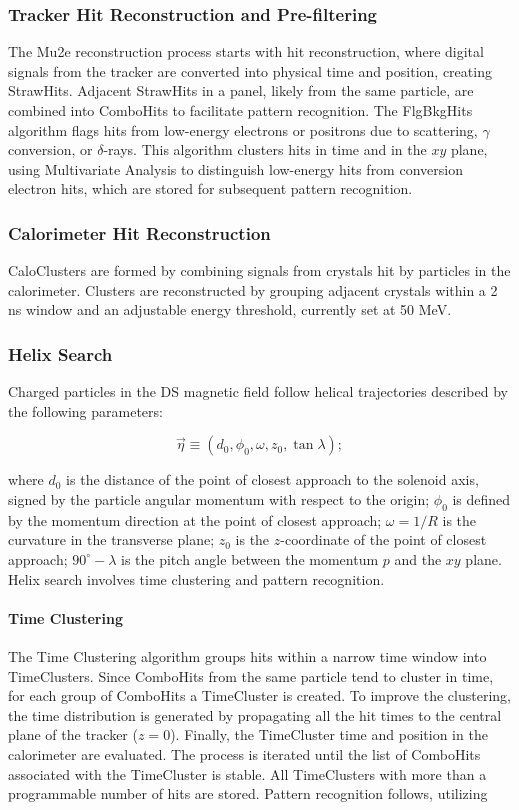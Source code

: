 \subsubsection{Tracker Hit Reconstruction and Pre-filtering}

The Mu2e reconstruction process starts with hit reconstruction, where digital signals from the tracker are converted into physical time and position, creating StrawHits. Adjacent StrawHits in a panel, likely from the same particle, are combined into ComboHits to facilitate pattern recognition. The FlgBkgHits algorithm flags hits from low-energy electrons or positrons due to scattering, $\gamma$ conversion, or $\delta$-rays. This algorithm clusters hits in time and in the $xy$ plane, using Multivariate Analysis to distinguish low-energy hits from conversion electron hits, which are stored for subsequent pattern recognition.

\subsubsection{Calorimeter Hit Reconstruction}

CaloClusters are formed by combining signals from crystals hit by particles in the calorimeter. Clusters are reconstructed by grouping adjacent crystals within a 2 ns window and an adjustable energy threshold, currently set at 50 MeV.

\subsubsection{Helix Search}

Charged particles in the DS magnetic field follow helical trajectories described by the following parameters:

\[
\vec{\eta} \equiv (d_0, \phi_0, \omega, z_0, \tan \lambda);
\]

where $d_0$ is the distance of the point of closest approach to the solenoid axis, signed by the particle angular momentum with respect to the origin; $\phi_0$ is defined by the momentum direction at the point of closest approach; $\omega = 1/R$ is the curvature in the transverse plane; $z_0$ is the $z$-coordinate of the point of closest approach; $90^\circ - \lambda$ is the pitch angle between the momentum $p$ and the $xy$ plane. Helix search involves time clustering and pattern recognition.

\paragraph{Time Clustering}

The Time Clustering algorithm groups hits within a narrow time window into TimeClusters. Since ComboHits from the same particle tend to cluster in time, for each group of ComboHits a TimeCluster is created. To improve the clustering, the time distribution is generated by propagating all the hit times to the central plane of the tracker ($z=0$). Finally, the TimeCluster time and position in the calorimeter are evaluated. The process is iterated until the list of ComboHits associated with the TimeCluster is stable. All TimeClusters with more than a programmable number of hits are stored. Pattern recognition follows, utilizing

